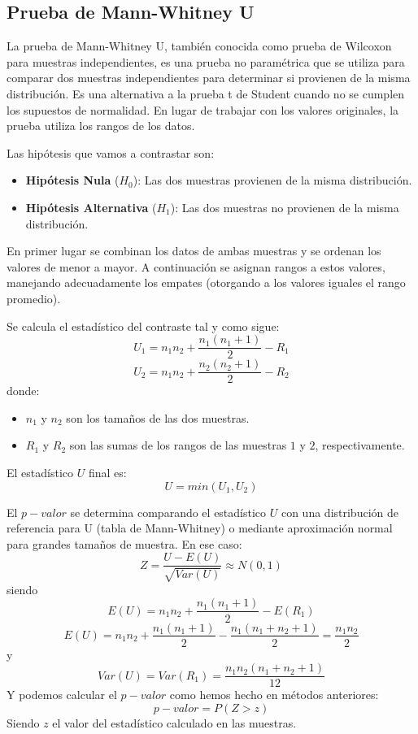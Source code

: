 \documentclass[
  letterpaper,
  DIV=11,
  numbers=noendperiod]{scrreprt}
\providecommand{\tightlist}{%
  \setlength{\itemsep}{0pt}\setlength{\parskip}{0pt}}\usepackage{longtable,booktabs,array}
\begin{document}
\hypertarget{prueba-de-mann-whitney-u}{%
\subsection{Prueba de Mann-Whitney U}\label{prueba-de-mann-whitney-u}}

La prueba de Mann-Whitney U, también conocida como prueba de Wilcoxon
para muestras independientes, es una prueba no paramétrica que se
utiliza para comparar dos muestras independientes para determinar si
provienen de la misma distribución. Es una alternativa a la prueba t de
Student cuando no se cumplen los supuestos de normalidad. En lugar de
trabajar con los valores originales, la prueba utiliza los rangos de los
datos.

Las hipótesis que vamos a contrastar son:

\begin{itemize}
\tightlist
\item
  \textbf{Hipótesis Nula} (\(H_0\)): Las dos muestras provienen de la
  misma distribución.
\item
  \textbf{Hipótesis Alternativa} (\(H_1\)): Las dos muestras no
  provienen de la misma distribución.
\end{itemize}

En primer lugar se combinan los datos de ambas muestras y se ordenan los
valores de menor a mayor. A continuación se asignan rangos a estos
valores, manejando adecuadamente los empates (otorgando a los valores
iguales el rango promedio).

Se calcula el estadístico del contraste tal y como sigue:
\[  U_1 = n_1 n_2 + \frac{n_1 (n_1 + 1)}{2} - R_1
\] \[
U_2 = n_1 n_2 + \frac{n_2 (n_2 + 1)}{2} - R_2
\] donde:

\begin{itemize}
\tightlist
\item
  \(n_1\) y \(n_2\) son los tamaños de las dos muestras.
\item
  \(R_1\) y \(R_2\) son las sumas de los rangos de las muestras \(1\) y
  \(2\), respectivamente.
\end{itemize}

El estadístico \(U\) final es: \[
U=min(U_1,U_2)
\]

El \(p-valor\) se determina comparando el estadístico \(U\) con una
distribución de referencia para U (tabla de Mann-Whitney) o mediante
aproximación normal para grandes tamaños de muestra. En ese caso: \[
Z=\frac{U-E(U)}{\sqrt{Var(U)}} \approx N(0,1)
\] siendo \[
E(U)=n_1n_2+\frac{n_1(n_1+1)}{2}-E(R_1)
\] \[
E(U)= n_1n_2+\frac{n_1(n_1+1)}{2}-\frac{n_1(n_1+n_2+1)}{2}=\frac{n_1n_2}{2}
\] y \[
Var(U)=Var(R_1)=\frac{n_1n_2(n_1+n_2+1)}{12}
\] Y podemos calcular el \(p-valor\) como hemos hecho en métodos
anteriores: \[
p-valor=P(Z>z)
\] Siendo \(z\) el valor del estadístico calculado en las muestras.
\end{document}
